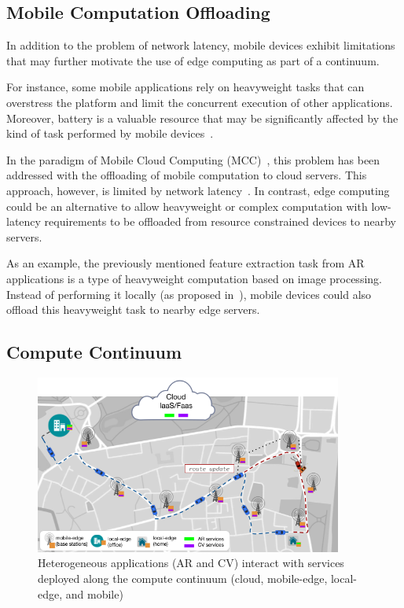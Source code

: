 \subsection{Mobile Computation Offloading}

In addition to the problem of network latency, mobile devices exhibit limitations that may further motivate the use of edge computing as part of a continuum. 

For instance, some mobile applications rely on heavyweight tasks that can overstress the platform and limit the concurrent execution of other applications. Moreover, battery is a valuable resource that may be significantly affected by the kind of task performed by mobile devices~\cite{Carroll:2010}. 

In the paradigm of Mobile Cloud Computing (MCC)~\cite{Khan:14}, this problem has been addressed with the offloading of mobile computation to cloud servers. This approach, however, is limited by network latency~\cite{Satyanarayanan:2009}. In contrast, edge computing could be an alternative to allow heavyweight or complex computation with low-latency requirements to be offloaded from resource constrained devices to nearby servers.


As an example, the previously mentioned feature extraction task from AR applications is a type of heavyweight computation based on image processing. Instead of performing it locally (as proposed in~\cite{Huang2012}), mobile devices could also offload this heavyweight task to nearby edge servers. 

\subsection{Compute Continuum}


\begin{figure}[tbp]
	\includegraphics[width=0.9\textwidth]{figs/continuum.png}
	\caption{Heterogeneous applications (AR and CV) interact with services deployed along the compute continuum (cloud, mobile-edge, local-edge, and mobile)}
	\label{fig:continuum}
\end{figure}

